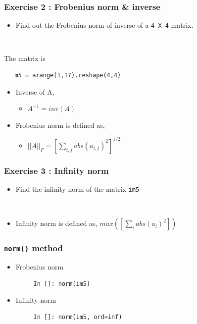 \documentclass[presentation]{beamer}
\begin{document}
\begin{frame}[fragile]
\frametitle{Exercise 2 : Frobenius norm \& inverse}
\label{sec-6}

\begin{itemize}
\item Find out the Frobenius norm of inverse of a \verb~4 X 4~ matrix.
\end{itemize}
\begin{verbatim}
   
\end{verbatim}

  The matrix is
\begin{verbatim}
   m5 = arange(1,17).reshape(4,4)
\end{verbatim}


\begin{itemize}
\item Inverse of A,
\begin{itemize}
\item $A^{-1} = inv(A)$
\end{itemize}
\item Frobenius norm is defined as,
\begin{itemize}
\item $||A||_F = [\sum_{i,j} abs(a_{i,j})^2]^{1/2}$
\end{itemize}
\end{itemize}
\end{frame}
\begin{frame}[fragile]
\frametitle{Exercise 3 : Infinity norm}
\label{sec-7}

\begin{itemize}
\item Find the infinity norm of the matrix \verb~im5~
\end{itemize}
\begin{verbatim}
   
\end{verbatim}


\begin{itemize}
\item Infinity norm is defined as,
       $max([\sum_{i} abs(a_{i})^2])$
\end{itemize}
\end{frame}
\begin{frame}[fragile]
\frametitle{\verb~norm()~ method}
\label{sec-8}


\begin{itemize}
\item Frobenius norm
\begin{verbatim}
     In []: norm(im5)
\end{verbatim}

\item Infinity norm
\begin{verbatim}
     In []: norm(im5, ord=inf)
\end{verbatim}

\end{itemize}
\end{frame}
\end{document}
